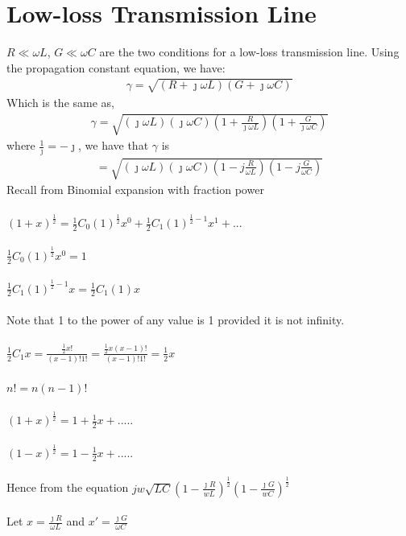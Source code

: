 \section{Low-loss Transmission Line}
$R \ll \omega L$, $G \ll \omega C$ are the two conditions for a low-loss transmission line. Using the propagation constant equation, we have:
\begin{align*}
\gamma = \sqrt{(R + \jmath\omega L)(G + \jmath\omega C)}
\end{align*}
Which is the same as,
\begin{align*}
\gamma = \sqrt{{(\jmath\omega L)(\jmath\omega C)(1 + \frac{R}{\jmath\omega L})(1 + \frac{G}{\jmath\omega C})}}
\end{align*}
where $\frac{1}{\jmath} = -\jmath$, we have that $\gamma$ is
\begin{align*}
= \sqrt{{(\jmath\omega L)(\jmath\omega C)(1 - j\frac{R}{\omega L})(1 - j\frac{G}{\omega C})}}
\end{align*}
Recall from Binomial expansion with fraction power\\\\
$(1 + x)^{\frac{1}{2}} = \frac{1}{2}C_0(1)^{\frac{1}{2}}x^0 + \frac{1}{2}C_1(1)^{{\frac{1}{2}} - 1}x^1 + ...$\\\\
$\frac{1}{2}C_0(1)^{\frac{1}{2}}x^0 = 1$\\\\
$\frac{1}{2}C_1(1)^{\frac{1}{2} - 1}x = \frac{1}{2}C_1(1)x$\\\\
Note that 1 to the power of any value is 1 provided it is not infinity.\\\\
$\frac{1}{2}C_1 x = \frac{\frac{1}{2}x!}{(x - 1)!1!} = \frac{\frac{1}{2}x(x-1)!}{(x-1)!1!} = \frac{1}{2}x$\\\\
$n! = n(n - 1)!$\\\\
$(1 + x)^{\frac{1}{2}} = 1 + \frac{1}{2}x + .....$\\\\
$(1 - x)^{\frac{1}{2}} = 1 - \frac{1}{2}x + .....$\\\\
Hence from the equation
$jw\sqrt{LC}(1 - \frac{\jmath R}{wL})^{\frac{1}{2}}(1 - \frac{\jmath G}{wC})^{\frac{1}{2}}$\\\\
Let $x = \frac{\jmath R}{\omega L}$ and $x' = \frac{\jmath G}{\omega C}$\\\\
